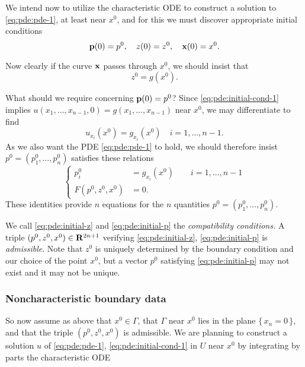 We intend now to utilize the characteristic ODE to construct a solution to
\eqref{eq:pde:pde-1}, at least near \(x^0\), and for this we must discover
appropriate initial conditions
\begin{equation}
  \label{eq:pde:initial-conds-2}
  \mathbf{p}(0)=p^0,\quad
  z(0)=z^0,\quad
  \mathbf{x}(0)=x^0.
\end{equation}

Now clearly if the curve \(\mathbf{x}\) passes through \(x^0\), we should insist
that
\begin{equation}
  \label{eq:pde:initial-z}
  z^0=g(x^0).
\end{equation}

What should we require concerning \(\mathbf{p}(0)=p^0\)? Since
\eqref{eq:pde:initial-cond-1} implies
\(u(x_1,\dotsc,x_{n-1},0)=g(x_1,\dotsc,x_{n-1})\) near \(x^0\), we may
differentiate to find
\[
  u_{x_i}(x^0)=g_{x_i}(x^0)\quad \text{\(i=1,\dotsc,n-1\).}
\]
As we also want the PDE \eqref{eq:pde:pde-1} to hold, we should therefore
insist \(p^0=(p_1^0,\dotsc,p_n^0)\) satisfies these relations
\begin{equation}
  \label{eq:pde:initial-p}
  \left\{
    \begin{aligned}
      p_i^0&=g_{x_i}(x^0)\qquad\text{\(i=1,\dotsc,n-1\)}\\
      F(p^0,z^0,x^0)&=0.
    \end{aligned}
  \right.
\end{equation}
These identities provide \(n\) equations for the \(n\) quantities
\(p^0=(p_1^0,\dotsc,p_n^0)\).

We call \eqref{eq:pde:initial-z} and \eqref{eq:pde:initial-p} the
\emph{compatibility conditions.} A triple \((p^0,z^0,x^0)\in\mathbf{R}^{2n+1}\)
verifying \eqref{eq:pde:initial-z}, \eqref{eq:pde:initial-p} is
\emph{admissible}. Note that \(z^0\) is uniquely determined by the boundary
condition and our choice of the point \(x^0\), but a vector \(p^0\)
satisfying \eqref{eq:pde:initial-p} may not exist and it may not be
unique.

\subsubsection{Noncharacteristic boundary data}
So now assume as above that \(x^0\in\Gamma\), that \(\Gamma\) near \(x^0\)
lies in the plane \(\{\,x_n=0\,\}\), and that the triple \((p^0,z^0,x^0)\)
is admissible. We are planning to construct a solution \(u\) of
\eqref{eq:pde:pde-1}, \eqref{eq:pde:initial-cond-1} in \(U\) near \(x^0\)
by integrating by parts the characteristic ODE


